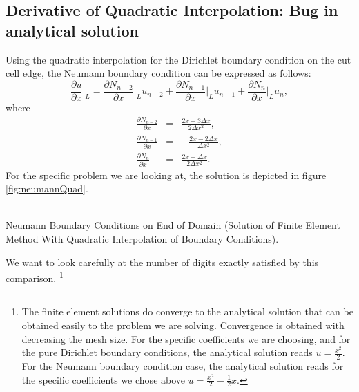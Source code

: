 \documentclass[a4paper,12pt]{article}
\makeatletter
\newenvironment{figurehere}
  {\def\@captype{figure}}
  {}
\makeatother
\begin{document}
\subsection{Derivative of Quadratic Interpolation: Bug in analytical solution}
Using the quadratic interpolation for the Dirichlet boundary condition on the cut cell edge, the Neumann boundary condition can be expressed as follows:
\begin{equation}
 \frac{\partial u}{\partial x}\vert_L = \frac{\partial N_{n-2}}{\partial x}\vert_L u_{n-2} + \frac{\partial N_{n-1}}{\partial x}\vert_L u_{n-1} + \frac{\partial N_n}{\partial x}\vert_L u_n,
\end{equation}
where
\begin{eqnarray}
\frac{\partial N_{n-2}}{\partial x} &=& \frac{2x-3\Delta x}{2 \Delta x^2},\\
\frac{\partial N_{n-1}}{\partial x} &=& -\frac{2x - 2\Delta x}{\Delta x^2},\\
\frac{\partial N_n}{\partial x} &=& \frac{2x - \Delta x}{2\Delta x^2}.
\end{eqnarray}
For the specific problem we are looking at, the solution is depicted in figure \ref{fig:neumannQuad}.
\begin{center}
\begin{figurehere} 
\\
\caption{Neumann Boundary Conditions on End of Domain (Solution of Finite Element Method With Quadratic Interpolation of Boundary Conditions).}\label{fig:neumannQuad}
\end{figurehere}
\end{center}
We want to look carefully at the number of digits exactly satisfied by this comparison.
\footnote{The finite element solutions do converge to the analytical solution that can be obtained easily to the problem we are solving. Convergence is obtained with decreasing the mesh size. For the specific coefficients we are choosing, and for the pure Dirichlet boundary conditions, the analytical solution reads $u = \frac{x^2}{2}$. For the Neumann boundary condition case, the analytical solution reads for the specific coefficients we chose above $u = \frac{x^2}{2} -\frac{1}{2}x$.}
\end{document}
